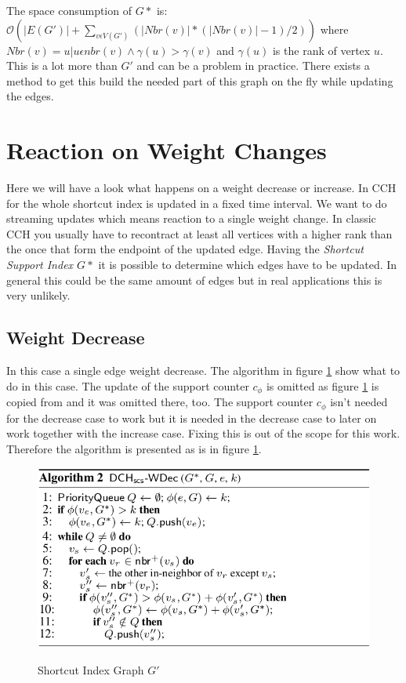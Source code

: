 \documentclass[twocolumn]{article}
\begin{document}
The space consumption of $G*$ is: 
\\
$\mathcal{O}(\vert E(G') \vert + \sum_{v \epsilon  V(G')}(\vert Nbr(v) \vert * (\vert Nbr(v) \vert-1)/2))$
where $Nbr(v) = {u\vert u \epsilon nbr(v) \land \gamma(u) > \gamma(v) }$ and $\gamma(u)$ is the rank of vertex $u$.
This is a lot more than $G'$ and can be a problem in practice. There exists a method to get this build the needed
part of this graph on the fly while updating the edges. 

\section{Reaction on Weight Changes}

Here we will have a look what happens on a weight decrease or increase. 
In CCH for the whole shortcut index is updated in a fixed time interval. We want to 
do streaming updates which means reaction to a single weight change. In classic
CCH you usually have to recontract at least all vertices with a higher rank than
the once that form the endpoint of the updated edge. Having the \textit{Shortcut Support Index $G*$}
it is possible to determine which edges have to be updated. In general this could
be the same amount of edges but in real applications this is very unlikely.

\subsection{Weight Decrease}

In this case a single edge weight decrease. The algorithm in figure \ref{fig:decreaseAlgorithm} 
show what to do in this case. The update of the support counter $c_{\phi}$ is omitted as
figure \ref{fig:decreaseAlgorithm} is copied from \cite{Ouyang2020} and it was omitted there, too. The support counter $c_{\phi}$
isn't needed for the decrease case to work but it is needed in the decrease case to later on 
work together with the increase case. Fixing this is out of the scope for this work. Therefore the 
algorithm is presented as is in figure \ref{fig:decreaseAlgorithm}. 

\begin{figure}[ht]
    \caption{Shortcut Index Graph $G'$}
    \centering
    \includegraphics[width=\linewidth]{decreaseAlgorithm}
    \label{fig:decreaseAlgorithm}
\end{figure}
\end{document}
